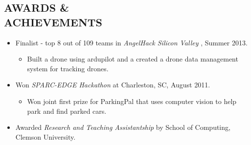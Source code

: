 \documentclass[line,margin]{res}
\begin{document}
\begin{resume}
		\section{AWARDS \& \\ ACHIEVEMENTS}
		\begin{itemize}  \itemsep -2pt             
			\item Finalist - top 8 out of 109 teams in {\it AngelHack Silicon Valley} , Summer 2013.
			\begin{itemize}  \itemsep -4pt 
				\item Built a drone using ardupilot and a created a drone data management system for tracking drones.
			\end{itemize}
			\item Won {\it SPARC-EDGE Hackathon} at Charleston, SC, August 2011.
			\begin{itemize}  \itemsep -4pt 
				\item Won joint first prize for ParkingPal that uses computer vision to help park and find parked cars.
			\end{itemize}
			\item Awarded {\it Research and Teaching Assistantship} by School of Computing, Clemson University.
		\end{itemize}
	\end{resume}
\end{document}

